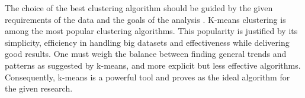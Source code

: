 The choice of the best clustering algorithm should be guided by the given requirements of the data and the goals of the analysis \cite{COL-ALT}.
K-means clustering is among the most popular clustering algorithms.
This popularity is justified by its simplicity, efficiency in handling big datasets and effectiveness while delivering good results.
One must weigh the balance between finding general trends and patterns as suggested by k-means, and more explicit but less effective algorithms.
Consequently, k-means is a powerful tool and proves as the ideal algorithm for the given research.




